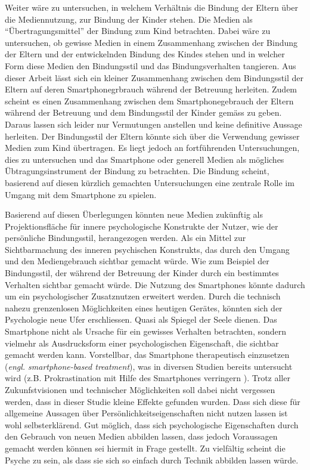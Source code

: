 Weiter wäre zu untersuchen, in welchem Verhältnis die Bindung der Eltern über die Mediennutzung, zur Bindung der Kinder stehen. Die Medien als \enquote{Übertragungsmittel} der Bindung zum Kind betrachten. Dabei wäre zu untersuchen, ob gewisse Medien in einem Zusammenhang zwischen der Bindung der Eltern und der entwickelnden Bindung des Kindes stehen und in welcher Form diese Medien den Bindungsstil und das Bindungsverhalten tangieren. Aus dieser Arbeit lässt sich ein kleiner Zusammenhang zwischen dem Bindungsstil der Eltern auf deren Smartphonegrbrauch während der Betreuung herleiten. Zudem scheint es einen Zusammenhang zwischen dem Smartphonegebrauch der Eltern während der Betreuung und dem Bindungsstil der Kinder gemäss  zu geben. Daraus lassen sich leider nur Vermutungen anstellen und keine definitive Aussage herleiten. Der Bindungsstil der Eltern könnte sich über die Verwendung gewisser Medien zum Kind übertragen. Es liegt jedoch an fortführenden Untersuchungen, dies zu untersuchen und das Smartphone oder generell Medien als mögliches Übtragungsinstrument der Bindung zu betrachten. Die Bindung scheint, basierend auf diesen kürzlich gemachten Untersuchungen eine zentrale Rolle im Umgang mit dem Smartphone zu spielen.

Basierend auf diesen Überlegungen könnten neue Medien zukünftig als Projektionsfläche für innere psychologische Konstrukte der Nutzer, wie der persönliche Bindungsstil, herangezogen werden. Als ein Mittel zur Sichtbarmachung des inneren psychischen Konstrukts, das durch den Umgang und den Mediengebrauch sichtbar gemacht würde. Wie zum Beispiel der Bindungsstil, der während der Betreuung der Kinder durch ein bestimmtes Verhalten sichtbar gemacht würde. Die Nutzung des Smartphones könnte dadurch um ein psychologischer Zusatznutzen erweitert werden. Durch die technisch nahezu grenzenlosen Möglichkeiten eines heutigen Gerätes, könnten sich der Psychologie neue Ufer erschliessen. Quasi als Spiegel der Seele dienen. Das Smartphone nicht als Ursache für ein gewisses Verhalten betrachten, sondern vielmehr als Ausdrucksform einer psychologischen Eigenschaft, die sichtbar gemacht werden kann. Vorstellbar, das Smartphone therapeutisch einzusetzen (\textit{engl. smartphone-based treatment}), was in diversen Studien bereits untersucht wird (z.B. Prokrastination mit Hilfe des Smartphones verringern \cite{Lukas2018}). Trotz aller Zukunfstvisionen und technischer Möglichkeiten soll dabei nicht vergessen werden, dass in dieser Studie kleine Effekte gefunden wurden. Dass sich diese für allgemeine Aussagen über Persönlichkeitseigenschaften nicht nutzen lassen ist wohl selbsterklärend. Gut möglich, dass sich psychologische Eigenschaften durch den Gebrauch von neuen Medien abbilden lassen, dass jedoch Voraussagen gemacht werden können sei hiermit in Frage gestellt. Zu vielfältig scheint die Psyche zu sein, als dass sie sich so einfach durch Technik abbilden lassen würde.  

